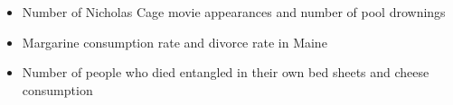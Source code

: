 \begin{itemize}
	\item Number of Nicholas Cage movie appearances and number of pool drownings
	\item Margarine consumption rate and divorce rate in Maine
	\item Number of people who died entangled in their own bed sheets and cheese consumption
\end{itemize}
